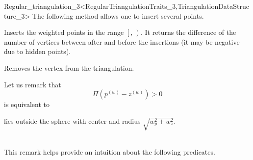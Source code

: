 \begin{ccRefClass}{Regular_triangulation_3<RegularTriangulationTraits_3,TriangulationDataStructure_3>}
The following method allows one to insert several points.

{Inserts the weighted points in the range $\left[\right.$,
$\left.\right)$. 
It returns the difference of the number of vertices between after and
before the insertions (it may be negative due to hidden points).
}


{Removes the vertex  from the triangulation.}


Let us remark that 
\[\Pi({p}^{(w)}-{z}^{(w)}) > 0\]
is equivalent to\\
\centerline{ lies outside the sphere with center  and radius
$\sqrt{w_p^2+w_z^2}$.}\\
This remark helps provide an intuition about the following predicates.


\end{ccRefClass}
